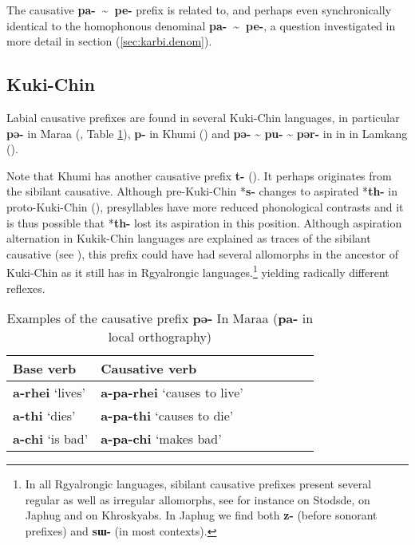 \documentclass[oneside,a4paper,11pt]{article}
\newcommand{\ipa}[1]{\textbf{{\phon\mbox{#1}}}} %
\newcommand{\forme}[2]{\ipa{#1} `#2'}
\newcommand{\refb}[1]{(\ref{#1})}
\newcommand{\tld}{\textasciitilde{}}
\begin{document}
The causative \ipa{pa- \tld{} pe-} prefix is related to, and perhaps even synchronically identical to the homophonous denominal \ipa{pa- \tld{} pe-}, a question investigated in more detail in section \refb{sec:karbi.denom}.

\subsection{Kuki-Chin}  \label{sec:kc}
Labial causative prefixes are found in several Kuki-Chin languages, in particular \ipa{pə-} in Maraa (\citealt[139]{hartmann01prenasalization}, Table \ref{tab:maraa}), \ipa{p-} in Khumi (\citealt[99]{peterson10elaborate}) and \ipa{pə-} \tld{} \ipa{pu-} \tld{} \ipa{pər-} in in in Lamkang (\citealt[52-4]{chelliah07lamkang}).

Note that Khumi has another causative prefix \ipa{t-} (\citealt[12]{hartmann13valence}). It perhaps originates from the sibilant causative. Although pre-Kuki-Chin *\ipa{s-} changes to aspirated *\ipa{th-} in proto-Kuki-Chin (\citealt[16]{vanbik09pkc}), presyllables have more reduced phonological contrasts and it is thus possible that *\ipa{th-} lost its aspiration in this position. Although aspiration alternation in Kukik-Chin languages are explained as traces of the sibilant causative (see \citealt[220;259]{vanbik09pkc}), this prefix could have had several allomorphs in the ancestor of Kuki-Chin as it still has in Rgyalrongic languages.\footnote{In all Rgyalrongic languages, sibilant causative prefixes present several regular as well as irregular allomorphs, see for instance \citet{jackson07shangzhai} on Stodsde, \citet{jacques15causative} on Japhug and \citet{lai16caus} on Khroskyabs. In Japhug we find both \ipa{z-} (before sonorant prefixes) and \ipa{sɯ-} (in most contexts).} yielding radically different reflexes.


\begin{table}[H]
\caption{Examples of the causative prefix \ipa{pə-} In Maraa (\ipa{pa-} in local orthography)} \centering \label{tab:maraa}
\begin{tabular}{lllllll}
\toprule
Base verb & Causative verb \\
\midrule
\forme{a-rhei}{lives} & \forme{a-pa-rhei}{causes to live} \\
\forme{a-thi}{dies} & \forme{a-pa-thi}{causes to die} \\
\forme{a-chi}{is bad} & \forme{a-pa-chi}{makes bad} \\
\bottomrule
\end{tabular}
\end{table}
\end{document}
